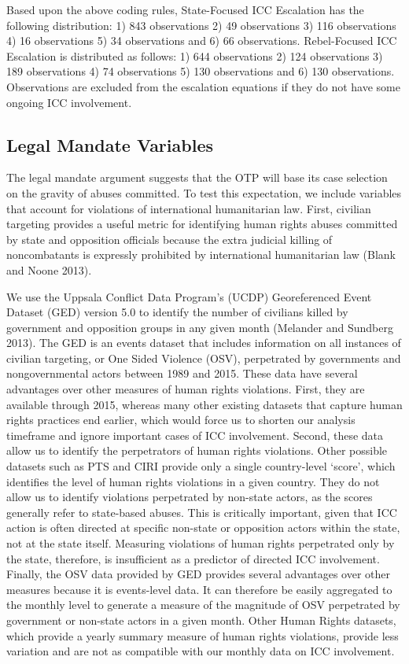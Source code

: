 Based upon the above coding rules, State-Focused ICC Escalation has the following distribution: 1) 843 observations 2) 49 observations 3) 116 observations 4) 16 observations 5) 34 observations and 6) 66 observations.  Rebel-Focused ICC Escalation is distributed as follows: 1) 644 observations 2) 124 observations 3) 189 observations 4) 74 observations 5) 130 observations and 6) 130 observations.   Observations are excluded from the escalation equations if they do not have some ongoing ICC involvement.

\subsection*{Legal Mandate Variables}

The legal mandate argument suggests that the OTP will base its case selection on the gravity of abuses committed.  To test this expectation, we include variables that account for violations of international humanitarian law.  First, civilian targeting provides a useful metric for identifying human rights abuses committed by state and opposition officials because the extra judicial killing of noncombatants is expressly prohibited by international humanitarian law (Blank and Noone 2013).

We use the Uppsala Conflict Data Program’s (UCDP) Georeferenced Event Dataset (GED) version 5.0 to identify the number of civilians killed by government and opposition groups in any given month (Melander and Sundberg 2013).  The GED is an events dataset that includes information on all instances of civilian targeting, or One Sided Violence (OSV), perpetrated by governments and nongovernmental actors between 1989 and 2015.  These data have several advantages over other measures of human rights violations.  First, they are available through 2015, whereas many other existing datasets that capture human rights practices end earlier, which would force us to shorten our analysis timeframe and ignore important cases of ICC involvement.  Second, these data allow us to identify the perpetrators of human rights violations.  Other possible datasets such as PTS and CIRI provide only a single country-level ‘score’, which identifies the level of human rights violations in a given country.  They do not allow us to identify violations perpetrated by non-state actors, as the scores generally refer to state-based abuses.  This is critically important, given that ICC action is often directed at specific non-state or opposition actors within the state, not at the state itself.  Measuring violations of human rights perpetrated only by the state, therefore, is insufficient as a predictor of directed ICC involvement.  Finally, the OSV data provided by GED provides several advantages over other measures because it is events-level data.  It can therefore be easily aggregated to the monthly level to generate a measure of the magnitude of OSV perpetrated by government or non-state actors in a given month.  Other Human Rights datasets, which provide a yearly summary measure of human rights violations, provide less variation and are not as compatible with our monthly data on ICC involvement.

